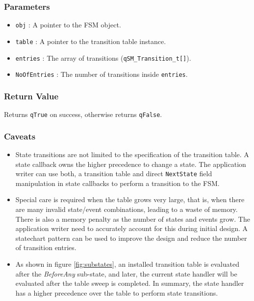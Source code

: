 \documentclass{article}
\begin{document}
\subsubsection*{Parameters}
\begin{itemize}
    \item \lstinline{obj} : A pointer to the FSM object. 
    \item \lstinline{table} : A pointer to the transition table instance.
    \item \lstinline{entries} : The array of transitions (\lstinline{qSM_Transition_t[]}). 
    \item \lstinline{NoOfEntries} : The number of transitions inside \lstinline{entries}.
\end{itemize}

\subsubsection*{Return Value}
Returns \lstinline{qTrue} on success, otherwise returns \lstinline{qFalse}.

\hrulefill

\subsubsection*{Caveats}
\begin{itemize}
    \item State transitions are not limited to the specification of the transition table. A state callback owns the higher precedence to change a state. The application writer can use both, a transition table and direct \lstinline{NextState} field manipulation in state callbacks to perform a transition to the FSM.
    \item Special care is required when the table grows very large, that is, when there are many invalid state/event combinations, leading to a waste of memory. There is also a memory penalty as the number of states and events grow. The application writer  need to accurately account for this during initial design. A statechart pattern can be used to improve the design and reduce the number of transition entries. 
    \item As shown in figure \ref{fig:substates}, an installed transition table is evaluated after the \textit{BeforeAny} sub-state, and later, the current state handler will be evaluated after the table sweep is completed. In summary, the state handler has a higher precedence over the table to perform state transitions.
\end{itemize}
\end{document}

